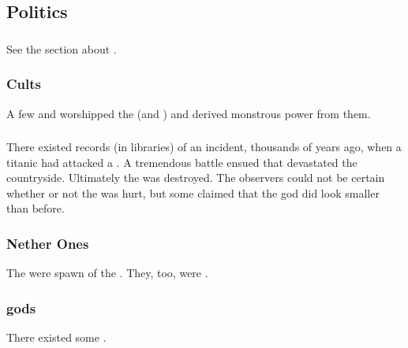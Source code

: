 \subsection{Politics}





\subsubsection{\Banes}
See the section about . 





\subsubsection{Cults}
A few \resphain and \Miithians worshipped the \umbrae (and ) and derived monstrous power from them.





\subsubsection{\Moongods}
There existed records (in \ophidian libraries) of an incident, thousands of years ago, when a titanic \umbra had attacked a \moongod. 
A tremendous battle ensued that devastated the countryside. 
Ultimately the \umbra was destroyed. 
The observers could not be certain whether or not the \moongod was hurt, but some claimed that the god did look smaller than before.





\subsubsection{Nether Ones}
The  were spawn of the \umbrae. 
They, too, were . 





\subsubsection{\Umbra gods}
There existed some .









